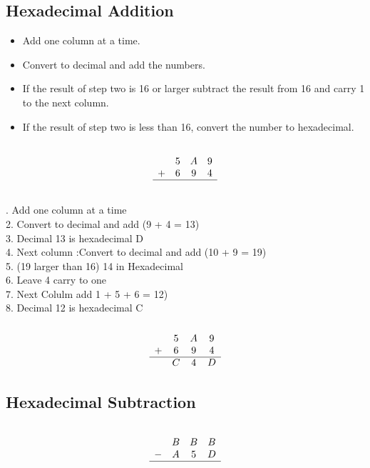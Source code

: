 \subsection*{Hexadecimal Addition}
\begin{itemize}
\item		Add one column at a time.

\item		Convert to decimal and add the numbers.

\item	If the result of step two is 16 or larger subtract the result from 16 and carry 1 to the next column.

\item	If the result of step two is less than 16, convert the number to hexadecimal.

\end{itemize}
\[\begin{array}{cccc}
	&		&		&		\\	
	&	5	&	A	&	9	\\	
	+&	6	&	9	&	4	\\	\hline
	&		&		&		\\	
\end{array} \]

. Add one column at a time\\
2. Convert to decimal and add (9 + 4 = 13)\\
3. Decimal 13 is hexadecimal D\\
4. Next column :Convert to decimal and add (10 + 9 = 19)\\
5. (19 larger than 16) 14 in Hexadecimal \\
6. Leave 4 carry to one\\
7.  Next Colulm add 1 + 5 + 6 = 12)\\
8. Decimal 12 is hexadecimal C\\

\[\begin{array}{cccc}
	&		&		&		\\	
	&	5	&	A	&	9	\\	
	+&	6	&	9	&	4	\\	\hline
	&	C	&	4	&	D	\\	
\end{array} \]

\subsection*{Hexadecimal Subtraction}
\[\begin{array}{cccc}
	&		&		&		\\	
	&	B	&	B	&	B	\\	
	-&	A	&	5	&	D	\\	\hline
	&		&		&		\\	
\end{array} \]


